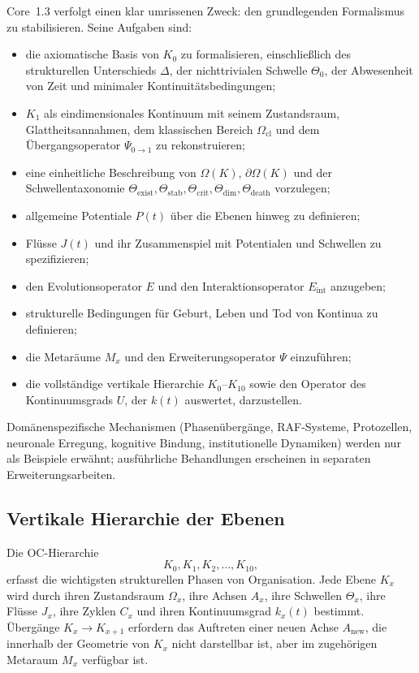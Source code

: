 Core~1.3 verfolgt einen klar umrissenen Zweck: den grundlegenden Formalismus zu stabilisieren. Seine Aufgaben sind:

\begin{itemize}
    \item die axiomatische Basis von \(K_0\) zu formalisieren, einschließlich des strukturellen Unterschieds \(\Delta\), der nichttrivialen Schwelle \(\Theta_0\), der Abwesenheit von Zeit und minimaler Kontinuitätsbedingungen;
    \item \(K_1\) als eindimensionales Kontinuum mit seinem Zustandsraum, Glattheitsannahmen, dem klassischen Bereich \(\Omega_{\mathrm{cl}}\) und dem Übergangsoperator \(\Psi_{0\to 1}\) zu rekonstruieren;
    \item eine einheitliche Beschreibung von \(\Omega(K)\), \(\partial\Omega(K)\) und der Schwellentaxonomie \(\Theta_{\mathrm{exist}}, \Theta_{\mathrm{stab}}, \Theta_{\mathrm{crit}}, \Theta_{\mathrm{dim}}, \Theta_{\mathrm{death}}\) vorzulegen;
    \item allgemeine Potentiale \(P(t)\) über die Ebenen hinweg zu definieren;
    \item Flüsse \(J(t)\) und ihr Zusammenspiel mit Potentialen und Schwellen zu spezifizieren;
    \item den Evolutionsoperator \(E\) und den Interaktionsoperator \(E_{\mathrm{int}}\) anzugeben;
    \item strukturelle Bedingungen für Geburt, Leben und Tod von Kontinua zu definieren;
    \item die Metaräume \(M_x\) und den Erweiterungsoperator \(\Psi\) einzuführen;
    \item die vollständige vertikale Hierarchie \(K_0\)–\(K_{10}\) sowie den Operator des Kontinuumsgrads \(U\), der \(k(t)\) auswertet, darzustellen.
\end{itemize}

Domänenspezifische Mechanismen (Phasenübergänge, RAF-Systeme, Protozellen, neuronale Erregung, kognitive Bindung, institutionelle Dynamiken) werden nur als Beispiele erwähnt; ausführliche Behandlungen erscheinen in separaten Erweiterungsarbeiten.

\subsection{Vertikale Hierarchie der Ebenen}

Die OC-Hierarchie
\[
K_0, K_1, K_2, \dots, K_{10},
\]
erfasst die wichtigsten strukturellen Phasen von Organisation. Jede Ebene \(K_x\) wird durch ihren Zustandsraum \(\Omega_x\), ihre Achsen \(A_x\), ihre Schwellen \(\Theta_x\), ihre Flüsse \(J_x\), ihre Zyklen \(C_x\) und ihren Kontinuumsgrad \(k_x(t)\) bestimmt. Übergänge \(K_x \to K_{x+1}\) erfordern das Auftreten einer neuen Achse \(A_{\mathrm{new}}\), die innerhalb der Geometrie von \(K_x\) nicht darstellbar ist, aber im zugehörigen Metaraum \(M_x\) verfügbar ist.

